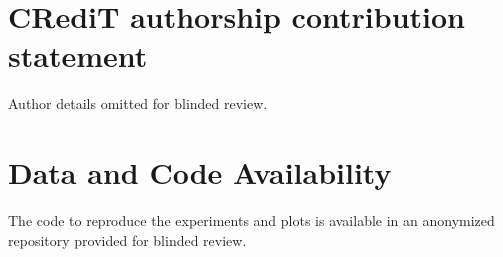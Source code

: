 \documentclass[preprint,12pt]{elsarticle}
\begin{document}
\section*{CRediT authorship contribution statement}
Author details omitted for blinded review.

\section*{Data and Code Availability}
\label{sec:data}
The code to reproduce the experiments and plots is available in an anonymized repository provided for blinded review.





\end{document}

